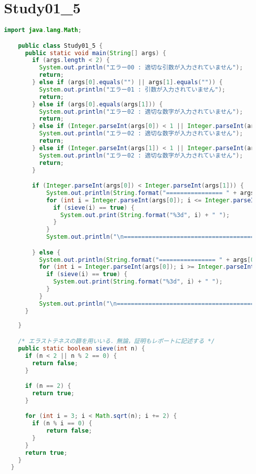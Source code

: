 \documentclass{jlreq}
\begin{document}
  \section*{Study01\_5}
  \begin{lstlisting}[caption=Study01\_5.javaのソースコード, label=code:in, language=java]
    import java.lang.Math;

    public class Study01_5 {
      public static void main(String[] args) {
        if (args.length < 2) {
          System.out.println("エラー00 : 適切な引数が入力されていません");
          return;
        } else if (args[0].equals("") || args[1].equals("")) {
          System.out.println("エラー01 : 引数が入力されていません");
          return;
        } else if (args[0].equals(args[1])) {
          System.out.println("エラー02 : 適切な数字が入力されていません");
          return;
        } else if (Integer.parseInt(args[0]) < 1 || Integer.parseInt(args[0]) > 1000 ) {
          System.out.println("エラー02 : 適切な数字が入力されていません");
          return;
        } else if (Integer.parseInt(args[1]) < 1 || Integer.parseInt(args[1]) > 1000 ) {
          System.out.println("エラー02 : 適切な数字が入力されていません");
          return;
        }

        if (Integer.parseInt(args[0]) < Integer.parseInt(args[1])) {
            System.out.println(String.format("================ " + args[0] + " から " + args[1] + " までの素数=================="));
            for (int i = Integer.parseInt(args[0]); i <= Integer.parseInt(args[1]); i++) {
              if (sieve(i) == true) {
                System.out.print(String.format("%3d", i) + " ");
              }
            }
            System.out.println("\n===========================================================");

        } else {
          System.out.println(String.format("================ " + args[0] + " から " + args[1] + " までの素数=================="));
          for (int i = Integer.parseInt(args[0]); i >= Integer.parseInt(args[1]); i--) {
            if (sieve(i) == true) {
              System.out.print(String.format("%3d", i) + " ");
            }
          }
          System.out.println("\n===========================================================");
      }
      
    }

    /* エラストテネスの篩を用いいる．無論，証明もレポートに記述する */
    public static boolean sieve(int n) {
      if (n < 2 || n % 2 == 0) {
        return false;
      }

      if (n == 2) {
        return true;
      }

      for (int i = 3; i < Math.sqrt(n); i += 2) {
        if (n % i == 0) {
            return false;
        }
      }
      return true;  
    }
  }

  \end{lstlisting}
\end{document}
